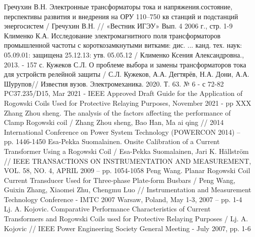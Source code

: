 Гречухин В.Н. Электронные трансформаторы тока и напряжения.состояние, перспективы развития
и внедрения на ОРУ 110–750 кв станций и подстанций энергосистем / Гречухин В.Н. //
«Вестник ИГЭУ» Вып. 4 2006 г., стр. 1-9
Клименко К.А. Исследование электромагнитного поля трансформаторов промышленной частоты с
короткозамкнутыми витками: дис. ... канд. тех. наук: 05.09.01: защищена 25.12.13: утв.
05.05.12 / Клименко Ксения Александровна., 2013. - 157 с.
Кужеков С.Л. О проблеме выбора и замены трансформаторов тока для устройств релейной защиты
/ С.Л. Кужеков, А.А. Дегтярёв, Н.А. Дони, А.А. Шурупов// Известия вузов. Электромеханика.
2020. Т. 63. № 6 - с 72-82
PC37.235/D15, Mar 2021 - IEEE Approved Draft Guide for the Application of Rogowski Coils
Used for Protective Relaying Purposes, November 2021 - pp XXX
Zhang Zhou sheng. The analysis of the factors affecting the performance of Clamp Rogowski
coil / Zhang Zhou sheng, Bao Han, Ma ai qing // 2014 International Conference on Power
System Technology (POWERCON 2014) – pp. 1446-1450
Esa-Pekka Suomalainen. Onsite Calibration of a Current Transformer Using a Rogowski Coil /
Esa-Pekka Suomalainen, Jari K. Hällström // IEEE TRANSACTIONS ON INSTRUMENTATION AND
MEASUREMENT, VOL. 58, NO. 4, APRIL 2009 – pp. 1054-1058
Peng Wang. Planar Rogowski Coil Current Transducer Used for Three-phase Plate-form Busbars
/ Peng Wang, Guixin Zhang, Xiaomei Zhu, Chengmu Luo // Instrumentation and Measurement
Technology Conference - IMTC 2007 Warsaw, Poland, May 1-3, 2007 – pp. 1-4
Lj. A. Kojovic. Comparative Performance Characteristics of Current Transformers and
Rogowski Coils used for Protective Relaying Purposes / Lj. A. Kojovic // IEEE Power
Engineering Society General Meeting - July 2007, pp. 1-6

